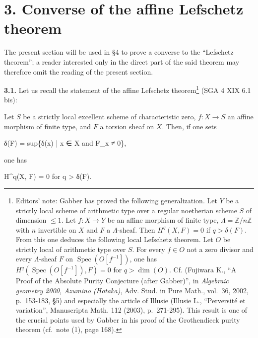 \documentclass[
  11pt,
  a4paper,
]{book}
\newenvironment{Shaded}{}{}
\newcommand{\NormalTok}[1]{#1}
\begin{document}
\section{3. Converse of the affine Lefschetz
theorem}\label{converse-of-the-affine-lefschetz-theorem}

The present section will be used in §4 to prove a converse to the
``Lefschetz theorem''; a reader interested only in the direct part of
the said theorem may therefore omit the reading of the present section.

\textbf{3.1.} Let us recall the statement of the affine Lefschetz
theorem\footnote{Editors' note: Gabber has proved the following
  generalization. Let \(Y\) be a strictly local scheme of arithmetic
  type over a regular noetherian scheme \(S\) of dimension
  \(\leqslant 1\). Let \(f : X \to Y\) be an affine morphism of finite
  type, \(\Lambda = \mathbb{Z}/n\mathbb{Z}\) with \(n\) invertible on
  \(X\) and \(F\) a \(\Lambda\)-sheaf. Then \(H^{q}(X, F) = 0\) if
  \(q > \delta(F)\). From this one deduces the following local Lefschetz
  theorem. Let \(O\) be strictly local of arithmetic type over \(S\).
  For every \(f \in O\) not a zero divisor and every \(\Lambda\)-sheaf
  \(F\) on \(\operatorname{Spec}(O[f^{-1}])\), one has
  \(H^{q}(\operatorname{Spec}(O[f^{-1}]), F) = 0\) for \(q > \dim(O)\).
  Cf. (Fujiwara K., ``A Proof of the Absolute Purity Conjecture (after
  Gabber)'', in \emph{Algebraic geometry 2000, Azumino (Hotaka)}, Adv.
  Stud. in Pure Math., vol.~36, 2002, p.~153-183, §5) and especially the
  article of Illusie (Illusie L., ``Perversité et variation'',
  Manuscripta Math. 112 (2003), p.~271-295). This result is one of the
  crucial points used by Gabber in his proof of the Grothendieck purity
  theorem (cf.~note (1), page 168).} (SGA 4 XIX 6.1 bis):

Let \(S\) be a strictly local excellent scheme of characteristic zero,
\(f : X \to S\) an affine morphism of finite type, and \(F\) a torsion
sheaf on \(X\). Then, if one sets

\begin{Shaded}
\begin{Highlighting}[]
\NormalTok{δ(F) = sup\{δ(x) | x ∈ X and F\_x ≠ 0\},}
\end{Highlighting}
\end{Shaded}

one has

\begin{Shaded}
\begin{Highlighting}[]
\NormalTok{H\^{}q(X, F) = 0 for q \textgreater{} δ(F).}
\end{Highlighting}
\end{Shaded}
\end{document}
